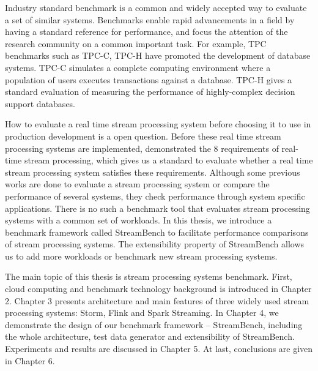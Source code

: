 Industry standard benchmark is a common and widely accepted way to evaluate a set of similar systems. Benchmarks enable rapid advancements in a field by having a standard reference for performance, and focus the attention of the research community on a common important task\cite{patterson2012better}. For example, TPC benchmarks such as TPC-C\cite{TPC-C}, TPC-H\cite{TPC-H}  have promoted the development of database systems. TPC-C simulates a complete computing environment where a population of users executes transactions against a database. TPC-H gives a standard evaluation of measuring the performance of highly-complex decision support databases.

How to evaluate a real time stream processing system before choosing it to use in production development is a open question.  Before these real time stream processing systems are implemented, \citeauthor{8requirements} demonstrated the 8 requirements\cite{8requirements} of real-time stream processing, which gives us a standard to evaluate whether a real time stream processing system satisfies these requirements.
Although some previous works\cite{cordovaanalysis, xinhstechblog, samza-benchmark, manoj-sotrm-vs-spark,flink-latency} are done to evaluate a stream processing system or compare the performance of several systems, they check performance through system specific applications. There is no such a benchmark tool that evaluates stream processing systems with a common set of workloads. In this thesis, we introduce a benchmark framework called StreamBench to facilitate performance comparisons of stream processing systems. The extensibility property of StreamBench allows us to add more workloads or benchmark new stream processing systems.

The main topic of this thesis is stream processing systems benchmark. First, cloud computing and benchmark technology background is introduced in Chapter 2. Chapter 3 presents architecture and main features of three widely used stream processing systems: Storm, Flink and Spark Streaming. In Chapter 4, we demonstrate the design of our benchmark framework -- StreamBench, including the whole architecture, test data generator and extensibility of StreamBench. Experiments and results are discussed in Chapter 5. At last, conclusions are given in Chapter 6.

\clearpage